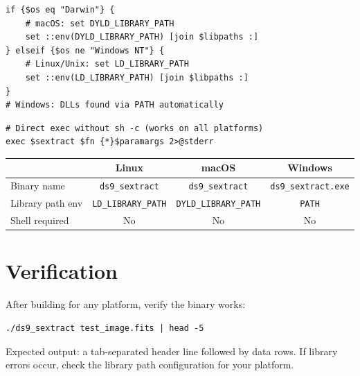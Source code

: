 \documentclass[11pt,fleqn]{book}
\begin{document}
\begin{codebox}
\begin{lstlisting}[style=tcl,numbers=none]
if {$os eq "Darwin"} {
    # macOS: set DYLD_LIBRARY_PATH
    set ::env(DYLD_LIBRARY_PATH) [join $libpaths :]
} elseif {$os ne "Windows NT"} {
    # Linux/Unix: set LD_LIBRARY_PATH
    set ::env(LD_LIBRARY_PATH) [join $libpaths :]
}
# Windows: DLLs found via PATH automatically
\end{lstlisting}
\end{codebox}

\begin{codebox}
\begin{lstlisting}[style=tcl,numbers=none]
# Direct exec without sh -c (works on all platforms)
exec $sextract $fn {*}$paramargs 2>@stderr
\end{lstlisting}
\end{codebox}

\begin{center}
\begin{tabular}{lccc}
\toprule
 & \textbf{Linux} & \textbf{macOS} & \textbf{Windows} \\
\midrule
Binary name & \texttt{ds9\_sextract} & \texttt{ds9\_sextract} & \texttt{ds9\_sextract.exe} \\
Library path env & \texttt{LD\_LIBRARY\_PATH} & \texttt{DYLD\_LIBRARY\_PATH} & \texttt{PATH} \\
Shell required & No & No & No \\
\bottomrule
\end{tabular}
\end{center}


\section{Verification}

After building for any platform, verify the binary works:

\begin{codebox}
\begin{lstlisting}[style=bash,numbers=none]
./ds9_sextract test_image.fits | head -5
\end{lstlisting}
\end{codebox}

Expected output: a tab-separated header line followed by data rows. If library errors occur, check the library path configuration for your platform.



\printbibliography[heading=bibintoc,title={References}]
\end{document}
